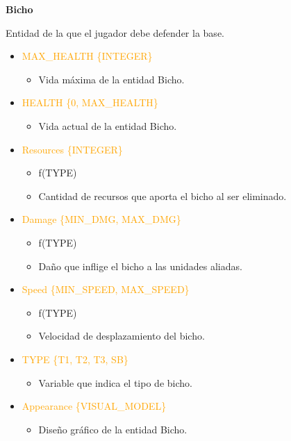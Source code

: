 \documentclass{article}
\begin{document}
\noindent \textbf{Bicho}

\hfill \break \noindent Entidad de la que el jugador debe defender la base.

\begin{itemize}
    \item \textcolor{Orange}{MAX\_HEALTH \{INTEGER\}}
    \begin{itemize}
        \item Vida máxima de la entidad Bicho.
    \end{itemize}
    \clearpage
    \item \textcolor{Orange}{HEALTH \{0, MAX\_HEALTH\}}
    \begin{itemize}
        \item Vida actual de la entidad Bicho.
    \end{itemize}
    \item \textcolor{Orange}{Resources \{INTEGER\}}
    \begin{itemize}
        \item f(TYPE)
        \item Cantidad de recursos que aporta el bicho al ser eliminado.
    \end{itemize}
    \item \textcolor{Orange}{Damage \{MIN\_DMG, MAX\_DMG\}}
    \begin{itemize}
        \item f(TYPE) 
        \item Daño que inflige el bicho a las unidades aliadas.
    \end{itemize}
    \item \textcolor{Orange}{Speed \{MIN\_SPEED, MAX\_SPEED\}}
    \begin{itemize}
        \item f(TYPE)
        \item Velocidad de desplazamiento del bicho.
    \end{itemize}
    \item \textcolor{Orange}{TYPE \{T1, T2, T3, SB\}}
    \begin{itemize}
        \item Variable que indica el tipo de bicho.
    \end{itemize}
     \item \textcolor{Orange}{Appearance \{VISUAL\_MODEL\}}
    \begin{itemize}
        \item Diseño gráfico de la entidad Bicho.
    \end{itemize}
\end{itemize}
\end{document}
